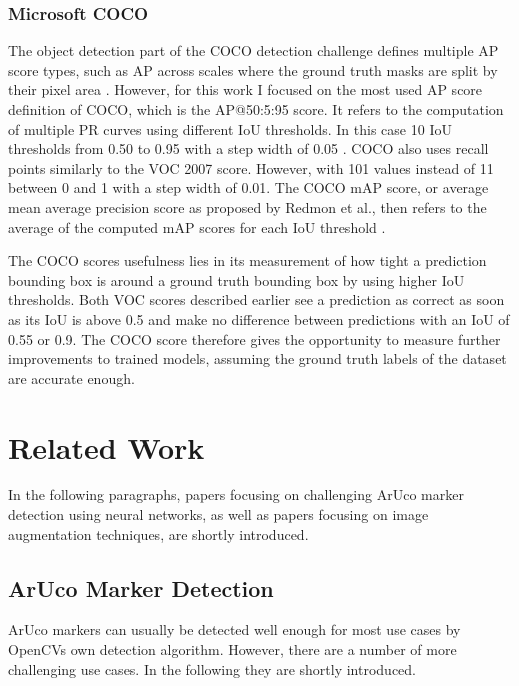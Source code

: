\documentclass[10pt]{book}
\begin{document}
\subsection{Microsoft COCO}

The object detection part of the \ac{COCO} detection challenge defines multiple AP score types, such as AP across scales where the ground truth masks are split by their pixel area \cite{padilla2020survey}. However, for this work I focused on the most used AP score definition of \ac{COCO}, which is the AP@50:5:95 score. It refers to the computation of multiple \acp{PR curve} using different \ac{IoU} thresholds. In this case 10 \ac{IoU} thresholds from 0.50 to 0.95 with a step width of 0.05 \cite{terven2023comprehensive}. \ac{COCO} also uses recall points similarly to the VOC 2007 score. However, with 101 values instead of 11 between 0 and 1 with a step width of 0.01. %
The \ac{COCO} mAP score, or average mean average precision score as proposed by Redmon et al., then refers to the average of the computed mAP scores for each \ac{IoU} threshold \cite{redmon2018yolov3}. 

The \ac{COCO} scores usefulness lies in its measurement of how tight a prediction bounding box is around a ground truth bounding box by using higher \ac{IoU} thresholds. Both VOC scores described earlier see a prediction as correct as soon as its \ac{IoU} is above 0.5 and make no difference between predictions with an \ac{IoU} of 0.55 or 0.9. The \ac{COCO} score therefore gives the opportunity to measure further improvements to trained models, assuming the ground truth labels of the dataset are accurate enough.

\chapter{Related Work}
\label{chap:relatedw}

In the following paragraphs, papers focusing on challenging \ac{ArUco} marker detection using neural networks, as well as papers focusing on image augmentation techniques, are shortly introduced.

\section{ArUco Marker Detection}

\ac{ArUco} markers can usually be detected well enough for most use cases by \acp{OpenCV} own detection algorithm. However, there are a number of more challenging use cases. In the following they are shortly introduced.
\end{document}
